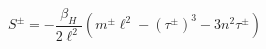 \begin{equation}
S^{\pm }=-\frac{\beta _{H}}{2\ell ^{2}}(m^{\pm }\ell ^{2}-\left( \tau ^{\pm
}\right) ^{3}-3n^{2}\tau ^{\pm })  \label{S}
\end{equation}%
